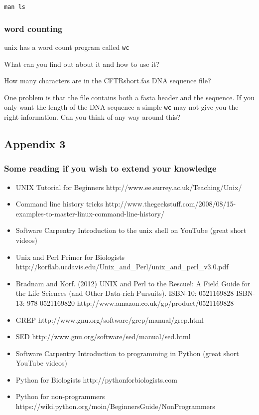 \documentclass[11pt]{article}
\providecommand{\tightlist}{%
      \setlength{\itemsep}{0pt}\setlength{\parskip}{0pt}}
\begin{document}
\texttt{man\ ls}

\hypertarget{word-counting}{%
\subsubsection{word counting}\label{word-counting}}

unix has a word count program called \texttt{wc}

What can you find out about it and how to use it?

How many characters are in the CFTRshort.fas DNA sequence file?

One problem is that the file contains both a fasta header and the
sequence. If you only want the length of the DNA sequence a simple
\texttt{wc} may not give you the right information. Can you think of any
way around this?

    \hypertarget{appendix-3}{%
\subsection{Appendix 3}\label{appendix-3}}

\hypertarget{some-reading-if-you-wish-to-extend-your-knowledge}{%
\subsubsection{Some reading if you wish to extend your
knowledge}\label{some-reading-if-you-wish-to-extend-your-knowledge}}

\begin{itemize}
\tightlist
\item
  UNIX Tutorial for Beginners http://www.ee.surrey.ac.uk/Teaching/Unix/
\item
  Command line history tricks
  http://www.thegeekstuff.com/2008/08/15-examples-to-master-linux-command-line-history/
\item
  Software Carpentry Introduction to the unix shell on YouTube (great
  short videos)
\item
  Unix and Perl Primer for Biologists
  http://korflab.ucdavis.edu/Unix\_and\_Perl/unix\_and\_perl\_v3.0.pdf
\item
  Bradnam and Korf. (2012) UNIX and Perl to the Rescue!: A Field Guide
  for the Life Sciences (and Other Data-rich Pursuits). ISBN-10:
  0521169828 ISBN-13: 978-0521169820
  http://www.amazon.co.uk/gp/product/0521169828
\item
  GREP http://www.gnu.org/software/grep/manual/grep.html
\item
  SED http://www.gnu.org/software/sed/manual/sed.html
\item
  Software Carpentry Introduction to programming in Python (great short
  YouTube videos)
\item
  Python for Biologists http://pythonforbiologists.com
\item
  Python for non-programmers
  https://wiki.python.org/moin/BeginnersGuide/NonProgrammers
\end{itemize}


    
    
    
    
\end{document}
